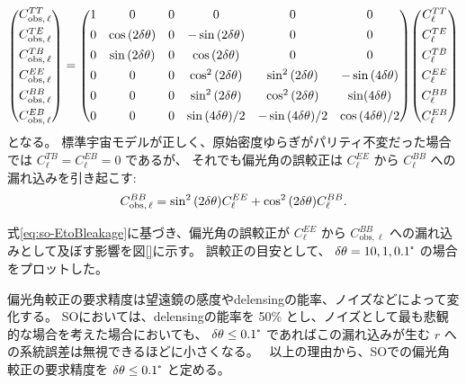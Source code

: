 \documentclass[../../main.tex]{subfiles}
\begin{document}
\begin{equation}
    \mqty( C_{\mathrm{obs},\,\ell}^{TT} \\[1ex]
           C_{\mathrm{obs},\,\ell}^{TE} \\[1ex]
           C_{\mathrm{obs},\,\ell}^{TB} \\[1ex]
           C_{\mathrm{obs},\,\ell}^{EE} \\[1ex]
           C_{\mathrm{obs},\,\ell}^{BB} \\[1ex]
           C_{\mathrm{obs},\,\ell}^{EB} )
    = \mqty( 1 & 0 & 0 & 0 & 0 & 0 \\[1ex]
             0 & \cos\qty(2\delta\theta) & 0 & -\sin\qty(2\delta\theta) & 0 & 0 \\[1ex]
             0 & \sin\qty(2\delta\theta) & 0 & \cos\qty(2\delta\theta) & 0 & 0 \\[1ex]
             0 & 0 & 0 & \cos^2\qty(2\delta\theta) & \sin^2\qty(2\delta\theta) & -\sin\qty(4\delta\theta) \\[1ex]
             0 & 0 & 0 & \sin^2\qty(2\delta\theta) & \cos^2\qty(2\delta\theta) & \sin(4\delta\theta) \\[1ex]
             0 & 0 & 0 & \sin\qty(4\delta\theta)/2 & -\sin\qty(4\delta\theta)/2 & \cos\qty(4\delta\theta)/2 )
    \mqty( C_{\ell}^{TT} \\[1ex]
              C_{\ell}^{TE} \\[1ex]
              C_{\ell}^{TB} \\[1ex]
              C_{\ell}^{EE} \\[1ex]
              C_{\ell}^{BB} \\[1ex]
              C_{\ell}^{EB} )
\end{equation}
となる。
標準宇宙モデルが正しく、原始密度ゆらぎがパリティ不変だった場合では $C_{\ell}^{TB}=C_{\ell}^{EB}=0$ であるが、
それでも偏光角の誤較正は $C_{\ell}^{EE}$ から $C_{\ell}^{BB}$ への漏れ込みを引き起こす:
\begin{equation}
    \label{eq:so-EtoBleakage}
    C_{\mathrm{obs},\,\ell}^{BB} = \sin^2\qty(2\delta\theta)C_{\ell}^{EE} + \cos^2\qty(2\delta\theta)C_{\ell}^{BB} .
\end{equation}

式\eqref{eq:so-EtoBleakage}に基づき、偏光角の誤較正が $C_{\ell}^{EE}$ から $C_{\mathrm{obs}, \ell}^{BB}$ への漏れ込みとして及ぼす影響を図\ref{}に示す。
誤較正の目安として、 $\delta\theta = 10, 1, 0.1\tcdegree$ の場合をプロットした。

偏光角較正の要求精度は望遠鏡の感度やdelensingの能率、ノイズなどによって変化する。
SOにおいては、delensingの能率を 50\% とし、ノイズとして最も悲観的な場合を考えた場合においても、
$\delta\theta \leq 0.1\tcdegree$ であればこの漏れ込みが生む $r$ への系統誤差は無視できるほどに小さくなる。~\cite{so:Bryan_2018}
以上の理由から、SOでの偏光角較正の要求精度を $\delta\theta \leq 0.1\tcdegree$ と定める。
\end{document}
